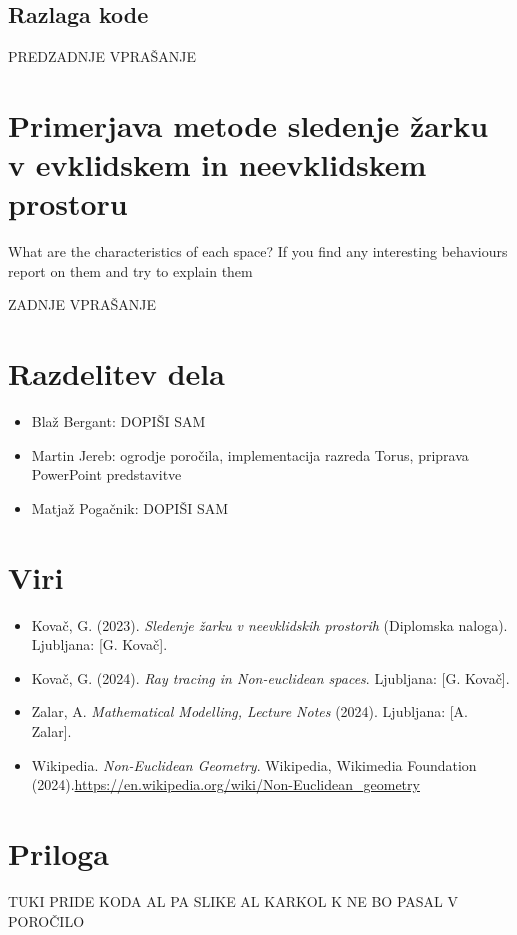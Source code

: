 \documentclass[titlepage]{article}
\begin{document}
\subsection{Razlaga kode}
PREDZADNJE VPRAŠANJE 

\section {Primerjava metode sledenje žarku v evklidskem in neevklidskem prostoru}
What are the characteristics of each space? If you find any
interesting behaviours report on them and try to explain them

ZADNJE VPRAŠANJE 

\section{Razdelitev dela}
\begin{itemize}
  \item Blaž Bergant: DOPIŠI SAM
  \item Martin Jereb: ogrodje poročila, implementacija razreda Torus, priprava PowerPoint predstavitve
  \item Matjaž Pogačnik: DOPIŠI SAM 
\end{itemize}


\section{Viri}
\begin{itemize}
  \item Kovač, G. (2023). \textit{Sledenje žarku v neevklidskih
prostorih} (Diplomska naloga). Ljubljana: [G. Kovač].
  \item Kovač, G. (2024). \textit{Ray tracing in Non-euclidean spaces}. Ljubljana: [G. Kovač].
  \item Zalar, A. \textit{Mathematical Modelling, Lecture Notes} (2024). Ljubljana: [A. Zalar].
    \item Wikipedia. \textit{Non-Euclidean Geometry}. Wikipedia, Wikimedia Foundation (2024).\url{https://en.wikipedia.org/wiki/Non-Euclidean_geometry}
\end{itemize}

\section{Priloga}
TUKI PRIDE KODA AL PA SLIKE AL KARKOL K NE BO PASAL V POROČILO
\end{document}
